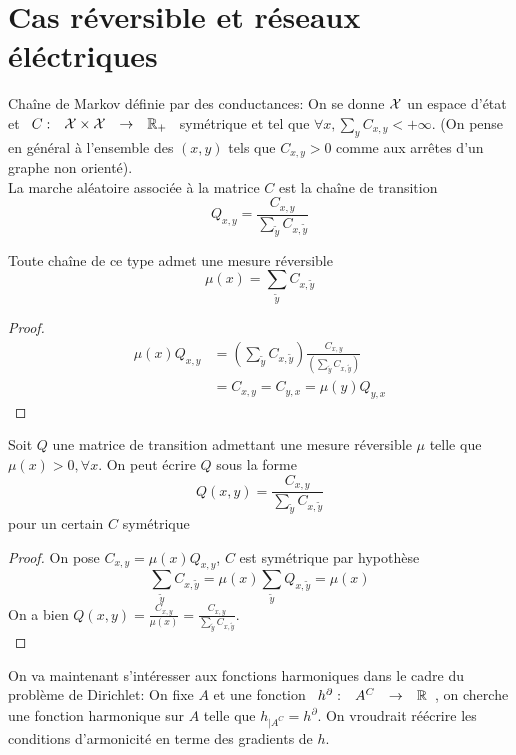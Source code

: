 \documentclass[]{report}
\begin{document}
    \section{Cas réversible et réseaux éléctriques}

    \begin{ex}{}{}
        Chaîne de Markov définie par des conductances:
        On se donne $\mathcal{X}$ un espace d'état et $\begin{array}{ccccc} C : & \mathcal{X}\times \mathcal{X} & \to & \mathbb{R}_+ \end{array}$ symétrique et tel que $\forall x,\sum_y C_{x,y}<+\infty$. (On pense en général à l'ensemble des $(x,y)$ tels que $C_{x,y}>0$ comme aux arrêtes d'un graphe non orienté). \\
        La marche aléatoire associée à la matrice $C$ est la chaîne de transition
        \[Q_{x,y}=\frac{C_{x,y}}{\sum_{\tilde{y}}C_{x,\tilde{y}}}\]
    \end{ex}

    \begin{re}{}{}
        Toute chaîne de ce type admet une mesure réversible
        \[\mu(x)=\sum_{\tilde{y}}C_{x,\tilde{y}}\]
    \end{re}

    \begin{proof}
        \begin{align*}
            \mu(x)Q_{x,y}&=(\sum_{\tilde{y}}C_{x,\tilde{y}})\frac{C_{x,y}}{(\sum_{\tilde{y}}C_{x,\tilde{y}})}\\
            &=C_{x,y}=C_{y,x}=\mu(y)Q_{y,x}
        \end{align*}
    \end{proof}

    \begin{prop}{}{}
        Soit $Q$ une matrice de transition admettant une mesure réversible $\mu$ telle que $\mu(x)>0,\forall x$. On peut écrire $Q$ sous la forme
        \[Q(x,y)=\dfrac{C_{x,y}}{\sum_{\tilde{y}}C_{x,\tilde{y}}}\]
        pour un certain $C$ symétrique
    \end{prop}

    \begin{proof}
        On pose $C_{x,y}=\mu(x)Q_{x,y}$, $C$ est symétrique par hypothèse
        \[\sum_{\tilde{y}}C_{x,\tilde{y}}=\mu(x)\sum_{\tilde{y}}Q_{x,\tilde{y}}=\mu(x)\]
        On a bien $Q(x,y)=\frac{C_{x,y}}{\mu(x)}=\frac{C_{x,y}}{\sum_{\tilde{y}}C_{x,\tilde{y}}}$.\\
    \end{proof}

    On va maintenant s'intéresser aux fonctions harmoniques dans le cadre du problème de Dirichlet: On fixe $A$ et une fonction $\begin{array}{ccccc} h^\partial : & A^C & \to & \mathbb{R} \end{array}$, on cherche une fonction harmonique sur $A$ telle que $h_{|A^C}=h^\partial$. On vroudrait réécrire les conditions d'armonicité en terme des gradients de $h$.
\end{document}

